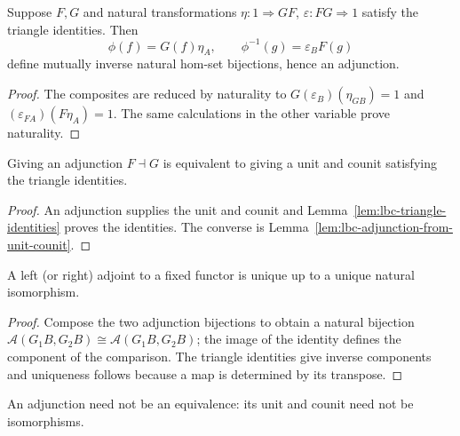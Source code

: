 \begin{lemma}
\label{lem:lbc-adjunction-from-unit-counit}
Suppose $F,G$ and natural transformations $\eta:1\Rightarrow GF$,
$\varepsilon:FG\Rightarrow1$ satisfy the triangle identities. Then
\[\phi(f)=G(f)\eta_A,\qquad \phi^{-1}(g)=\varepsilon_BF(g)\]
define mutually inverse natural hom-set bijections, hence an adjunction.
\end{lemma}
\begin{proof}
The composites are reduced by naturality to $G(\varepsilon_B)(\eta_{GB})=1$ and
$(\varepsilon_{FA})(F\eta_A)=1$. The same calculations in the other variable
prove naturality.
\end{proof}

\begin{theorem}
\label{thm:lbc-adjunction-unit-counit}
Giving an adjunction $F\dashv G$ is equivalent to giving a unit and counit
satisfying the triangle identities.
\end{theorem}
\begin{proof}
An adjunction supplies the unit and counit and Lemma~\ref{lem:lbc-triangle-identities}
proves the identities. The converse is Lemma~\ref{lem:lbc-adjunction-from-unit-counit}.
\end{proof}

\begin{corollary}
\label{cor:lbc-adjoint-unique}
A left (or right) adjoint to a fixed functor is unique up to a unique natural
isomorphism.
\end{corollary}
\begin{proof}
Compose the two adjunction bijections to obtain a natural bijection
$\mathcal A(G_1B,G_2B)\cong\mathcal A(G_1B,G_2B)$; the image of the identity
defines the component of the comparison. The triangle identities give inverse
components and uniqueness follows because a map is determined by its transpose.
\end{proof}

\begin{remark}
\label{rem:lbc-adjunction-equivalence}
An adjunction need not be an equivalence: its unit and counit need not be
isomorphisms.
\end{remark}

